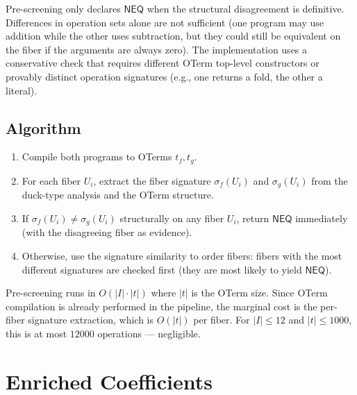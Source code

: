 \begin{remark}
Pre-screening only declares $\mathsf{NEQ}$ when the structural
disagreement is definitive.  Differences in operation sets alone
are not sufficient (one program may use addition while the other
uses subtraction, but they could still be equivalent on the fiber
if the arguments are always zero).  The implementation uses a
conservative check that requires different OTerm top-level
constructors or provably distinct operation signatures (e.g.,
one returns a fold, the other a literal).
\end{remark}

\subsection{Algorithm}

\begin{algorithm}
\caption{Cohomological Pre-Screening}
\label{alg:prescreen}
\begin{enumerate}
  \item Compile both programs to OTerms $t_f, t_g$.
  \item For each fiber $U_i$, extract the fiber signature
    $\sigma_f(U_i)$ and $\sigma_g(U_i)$ from the duck-type analysis
    and the OTerm structure.
  \item If $\sigma_f(U_i) \neq \sigma_g(U_i)$ structurally on any
    fiber $U_i$, return $\mathsf{NEQ}$ immediately (with the
    disagreeing fiber as evidence).
  \item Otherwise, use the signature similarity to order fibers:
    fibers with the most different signatures are checked first
    (they are most likely to yield $\mathsf{NEQ}$).
\end{enumerate}
\end{algorithm}

\begin{proposition}[Complexity]
Pre-screening runs in $O(|I| \cdot |t|)$ where $|t|$ is the OTerm
size.  Since OTerm compilation is already performed in the pipeline,
the marginal cost is the per-fiber signature extraction, which is
$O(|t|)$ per fiber.  For $|I| \leq 12$ and $|t| \leq 1000$, this
is at most $12000$ operations --- negligible.
\end{proposition}


\section{Enriched Coefficients}
\label{sec:enriched-coefficients}

